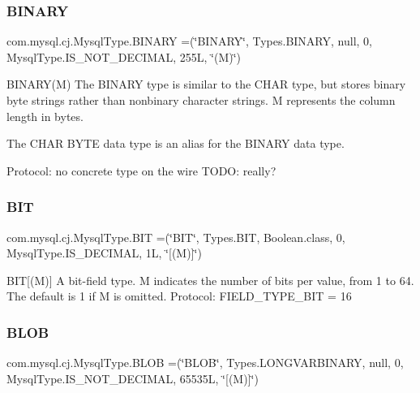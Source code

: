 \subsubsection{\texorpdfstring{B\+I\+N\+A\+RY}{BINARY}}
{\footnotesize\ttfamily com.\+mysql.\+cj.\+Mysql\+Type.\+B\+I\+N\+A\+RY =(\char`\"{}B\+I\+N\+A\+RY\char`\"{}, Types.\+B\+I\+N\+A\+RY, null, 0, Mysql\+Type.\+I\+S\+\_\+\+N\+O\+T\+\_\+\+D\+E\+C\+I\+M\+AL, 255\+L, \char`\"{}(\+M)\char`\"{})}

B\+I\+N\+A\+R\+Y(\+M) The B\+I\+N\+A\+RY type is similar to the C\+H\+AR type, but stores binary byte strings rather than nonbinary character strings. M represents the column length in bytes.

The C\+H\+AR B\+Y\+TE data type is an alias for the B\+I\+N\+A\+RY data type.

Protocol\+: no concrete type on the wire T\+O\+DO\+: really? \mbox{\label{enumcom_1_1mysql_1_1cj_1_1_mysql_type_aec2c26d184d9541cf9ba34c0325d0b18}} 
\subsubsection{\texorpdfstring{B\+IT}{BIT}}
{\footnotesize\ttfamily com.\+mysql.\+cj.\+Mysql\+Type.\+B\+IT =(\char`\"{}B\+IT\char`\"{}, Types.\+B\+IT, Boolean.\+class, 0, Mysql\+Type.\+I\+S\+\_\+\+D\+E\+C\+I\+M\+AL, 1\+L, \char`\"{}\mbox{[}(\+M)\mbox{]}\char`\"{})}

B\+IT\mbox{[}(M)\mbox{]} A bit-\/field type. M indicates the number of bits per value, from 1 to 64. The default is 1 if M is omitted. Protocol\+: F\+I\+E\+L\+D\+\_\+\+T\+Y\+P\+E\+\_\+\+B\+IT = 16 \mbox{\label{enumcom_1_1mysql_1_1cj_1_1_mysql_type_ab5c20c6e73cfab558b68240c5087aa47}} 
\subsubsection{\texorpdfstring{B\+L\+OB}{BLOB}}
{\footnotesize\ttfamily com.\+mysql.\+cj.\+Mysql\+Type.\+B\+L\+OB =(\char`\"{}B\+L\+OB\char`\"{}, Types.\+L\+O\+N\+G\+V\+A\+R\+B\+I\+N\+A\+RY, null, 0, Mysql\+Type.\+I\+S\+\_\+\+N\+O\+T\+\_\+\+D\+E\+C\+I\+M\+AL, 65535\+L, \char`\"{}\mbox{[}(\+M)\mbox{]}\char`\"{})}

